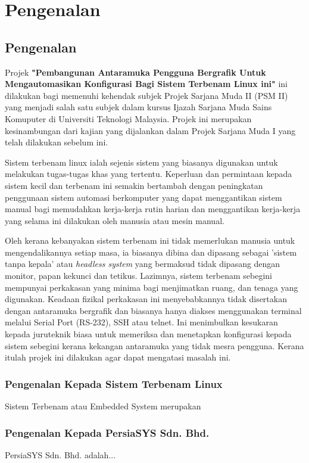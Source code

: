 \chapter{Pengenalan}\label{c1}%

\section{Pengenalan}
Projek \textbf{"Pembangunan Antaramuka Pengguna Bergrafik Untuk Mengautomasikan Konfigurasi Bagi Sistem Terbenam Linux ini"} ini dilakukan bagi memenuhi kehendak subjek Projek Sarjana Muda II (PSM II) yang menjadi salah satu subjek dalam kursus Ijazah Sarjana Muda Sains Komuputer di Universiti Teknologi Malaysia. Projek ini merupakan kesinambungan dari kajian yang dijalankan dalam Projek Sarjana Muda I yang telah dilakukan sebelum ini.

Sistem terbenam linux ialah sejenis sistem yang biasanya digunakan untuk melakukan tugas-tugas khas yang tertentu. Keperluan dan permintaan kepada sistem kecil dan terbenam ini semakin bertambah dengan peningkatan penggunaan sistem automasi berkomputer yang dapat menggantikan sistem manual bagi memudahkan kerja-kerja rutin harian dan menggantikan kerja-kerja yang selama ini dilakukan oleh manusia atau mesin manual. 

Oleh kerana kebanyakan sistem terbenam ini tidak memerlukan manusia untuk mengendalikannya setiap masa, ia biasanya dibina dan dipasang sebagai 'sistem tanpa kepala' atau \textit{headless system}\cite{w2} yang bermaksud tidak dipasang dengan monitor, papan kekunci dan tetikus. Lazimnya, sistem terbenam sebegini mempunyai perkakasan yang minima bagi menjimatkan ruang, dan tenaga yang digunakan. Keadaan fizikal perkakasan ini menyebabkannya tidak disertakan dengan antaramuka bergrafik dan biasanya hanya diakses menggunakan terminal melalui Serial Port (RS-232), SSH atau telnet. Ini menimbulkan kesukaran kepada juruteknik biasa untuk memeriksa dan menetapkan konfigurasi kepada sistem sebegini kerana kekangan antaramuka yang tidak mesra pengguna. Kerana itulah projek ini dilakukan agar dapat mengatasi masalah ini.

\subsection{Pengenalan Kepada Sistem Terbenam Linux}%
Sistem Terbenam atau Embedded System merupakan 

\subsection{Pengenalan Kepada PersiaSYS Sdn. Bhd.}%
PersiaSYS Sdn. Bhd. adalah...

